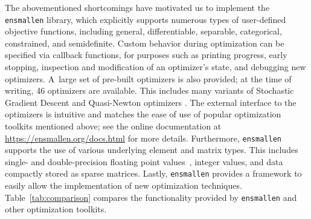 \documentclass[twoside,11pt]{article}
\begin{document}

The abovementioned shortcomings have motivated us to implement the {\tt ensmallen} library,
which explicitly supports numerous types of user-defined objective functions,
including general, differentiable, separable, categorical, constrained, and semidefinite.
Custom behavior during optimization can be specified via {callback} functions,
for purposes such as printing progress, early stopping, inspection and modification of an optimizer's state,
and debugging new optimizers.
A~large set of pre-built optimizers is also provided;
at the time of writing, 46 optimizers are available.
This includes many variants of Stochastic Gradient Descent \citep{Ruder_2016}
and Quasi-Newton optimizers \citep{zhu1997algorithm}.
The external interface to the optimizers is intuitive
and matches the ease of use of popular
optimization toolkits mentioned above;
see the online documentation at \mbox{\url{https://ensmallen.org/docs.html}} for more details.
Furthermore, {\tt ensmallen} supports the use of various underlying element and matrix types.
This includes single- and double-precision floating point values~\citep{Goldberg_CSUR_1991}, 
integer values, and data compactly stored as sparse matrices.
Lastly, {\tt ensmallen} provides a framework to easily allow the implementation of new optimization techniques.
Table~\ref{tab:comparison} compares the functionality provided
by {\tt ensmallen} and other optimization toolkits.
\end{document}

